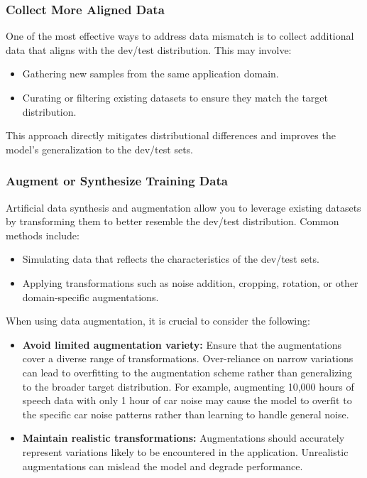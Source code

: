 \documentclass[12pt,openany]{book}
\begin{document}
\subsubsection{Collect More Aligned Data}

One of the most effective ways to address data mismatch is to collect additional data that aligns with the dev/test distribution. This may involve:
\begin{itemize}
    \item Gathering new samples from the same application domain.
    \item Curating or filtering existing datasets to ensure they match the target distribution.
\end{itemize}
This approach directly mitigates distributional differences and improves the model’s generalization to the dev/test sets.

\subsubsection{Augment or Synthesize Training Data}

Artificial data synthesis and augmentation allow you to leverage existing datasets by transforming them to better resemble the dev/test distribution. Common methods include:
\begin{itemize}
    \item Simulating data that reflects the characteristics of the dev/test sets.
    \item Applying transformations such as noise addition, cropping, rotation, or other domain-specific augmentations.
\end{itemize}

When using data augmentation, it is crucial to consider the following:
\begin{itemize}
    \item \textbf{Avoid limited augmentation variety:} Ensure that the augmentations cover a diverse range of transformations. Over-reliance on narrow variations can lead to overfitting to the augmentation scheme rather than generalizing to the broader target distribution. For example, augmenting 10,000 hours of speech data with only 1 hour of car noise may cause the model to overfit to the specific car noise patterns rather than learning to handle general noise.
    \item \textbf{Maintain realistic transformations:} Augmentations should accurately represent variations likely to be encountered in the application. Unrealistic augmentations can mislead the model and degrade performance.
\end{itemize}
\end{document}
